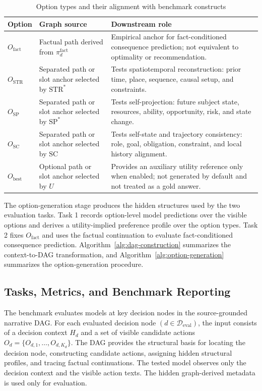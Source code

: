 \documentclass[pdflatex,sn-mathphys-num]{sn-jnl}%
\theoremstyle{thmstyleone}%
\theoremstyle{thmstyletwo}%
\theoremstyle{thmstylethree}%
\begin{document}
\begin{table}
\centering
\small
\caption{Option types and their alignment with benchmark constructs}
\label{tab:option-types-and-constructs}
\begin{tabular}{p{}p{}p{}}
\toprule
Option & Graph source & Downstream role \\
\midrule
$O_{\mathrm{fact}}$ & Factual path derived from $\pi_d^{\mathrm{fact}}$ & Empirical anchor for fact-conditioned consequence prediction; not equivalent to optimality or recommendation. \\
$O_{\mathrm{STR}}$ & Separated path or slot anchor selected by $\mathrm{STR}^{*}$ & Tests spatiotemporal reconstruction: prior time, place, sequence, causal setup, and constraints. \\
$O_{\mathrm{SP}}$ & Separated path or slot anchor selected by $\mathrm{SP}^{*}$ & Tests self-projection: future subject state, resources, ability, opportunity, risk, and state change. \\
$O_{\mathrm{SC}}$ & Separated path or slot anchor selected by $\mathrm{SC}$ & Tests self-state and trajectory consistency: role, goal, obligation, constraint, and local history alignment. \\
$O_{\mathrm{best}}$ & Optional path or slot anchor selected by $U$ & Provides an auxiliary utility reference only when enabled; not generated by default and not treated as a gold answer. \\
\bottomrule
\end{tabular}
\end{table}

The option-generation stage produces the hidden structures used by the two evaluation tasks. Task 1 records option-level model predictions over the visible options and derives a utility-implied preference profile over the option types. Task 2 fixes $O_{\mathrm{fact}}$ and uses the factual continuation to evaluate fact-conditioned consequence prediction. Algorithm~\ref{alg:dag-construction} summarizes the context-to-DAG transformation, and Algorithm~\ref{alg:option-generation} summarizes the option-generation procedure.


\subsection{Tasks, Metrics, and Benchmark Reporting}
The benchmark evaluates models at key decision nodes in the source-grounded narrative DAG. For each evaluated decision node $(d\in\mathcal{D}_{\mathrm{eval}})$, the input consists of a decision context $H_d$ and a set of visible candidate actions $O_d=\{O_{d,1},\ldots,O_{d,K_d}\}$. The DAG provides the structural basis for locating the decision node, constructing candidate actions, assigning hidden structural profiles, and tracing factual continuations. The tested model observes only the decision context and the visible action texts. The hidden graph-derived metadata is used only for evaluation.
\end{document}

